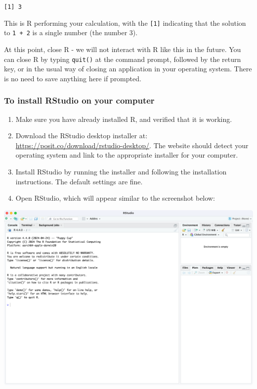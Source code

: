 \documentclass[
  a4paper,
]{memoir}
\providecommand{\tightlist}{%
  \setlength{\itemsep}{0pt}\setlength{\parskip}{0pt}}\usepackage{longtable,booktabs,array}
\begin{document}
\texttt{{[}1{]}\ 3}

This is R performing your calculation, with the \texttt{{[}1{]}}
indicating that the solution to \texttt{1\ +\ 2} is a single number (the
number 3).

At this point, close R - we will not interact with R like this in the
future. You can close R by typing \texttt{quit()} at the command prompt,
followed by the return key, or in the usual way of closing an
application in your operating system. There is no need to save anything
here if prompted.

\hypertarget{to-install-rstudio-on-your-computer}{%
\subsubsection{To install RStudio on your
computer}\label{to-install-rstudio-on-your-computer}}

\begin{enumerate}
\def\labelenumi{\arabic{enumi}.}
\tightlist
\item
  Make sure you have already installed R, and verified that it is
  working.
\item
  Download the RStudio desktop installer at:
  \url{https://posit.co/download/rstudio-desktop/}. The website should
  detect your operating system and link to the appropriate installer for
  your computer.
\item
  Install RStudio by running the installer and following the
  installation instructions. The default settings are fine.
\item
  Open RStudio, which will appear similar to the screenshot below:
\end{enumerate}

\includegraphics[width=1\textwidth,height=\textheight]{img/mod01/RStudio-screenshot-01.png}
\end{document}
